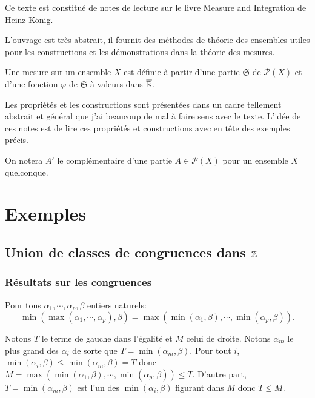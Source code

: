 
\noindent Ce texte est constitué de notes de lecture sur le livre Measure and Integration de Heinz König.

\noindent L'ouvrage est très abstrait, il fournit des méthodes de théorie des ensembles utiles pour les constructions et les démonstrations dans la théorie des mesures.

Une mesure sur un ensemble $X$ est définie à partir d'une partie $\mathfrak{S}$ de $\mathcal{P}(X)$ et d'une fonction $\varphi$ de $\mathfrak{S}$ à valeurs dans $\overline{\mathbb{R}}$.

Les propriétés et les constructions sont présentées dans un cadre tellement abstrait et général que j'ai beaucoup de mal à faire sens avec le texte. L'idée de ces notes est de lire ces propriétés et constructions avec en tête des exemples précis.

On notera $A'$ le complémentaire d'une partie $A \in \mathcal{P}(X)$ pour un ensemble $X$ quelconque.

\section{Exemples}
\subsection{Union de classes de congruences dans $\mathbb{Z}$}
\subsubsection{Résultats sur les congruences}
\begin{lem}
  Pour tous $\alpha_1, \cdots, \alpha_p, \beta$ entiers naturels:
  \begin{displaymath}
    \min \left( \max(\alpha_1, \cdots, \alpha_p) , \beta \right) = \max\left( \min(\alpha_1, \beta), \cdots , \min(\alpha_p,\beta)\right).
  \end{displaymath}
\end{lem}
\begin{demo}
  Notons $T$ le terme de gauche dans l'égalité et $M$ celui de droite. Notons $\alpha_m$ le plus grand des $\alpha_i$ de sorte que $T = \min(\alpha_m, \beta)$.\newline
  Pour tout $i$, $\min(\alpha_i, \beta) \leq \min (\alpha_m, \beta) = T$ donc $M = \max\left( \min(\alpha_1, \beta), \cdots , \min(\alpha_p,\beta)\right) \leq T$.\newline
  D'autre part, $T=\min (\alpha_m, \beta)$ est l'un des $\min(\alpha_i, \beta)$ figurant dans $M$ donc $T \leq M$.
\end{demo}

